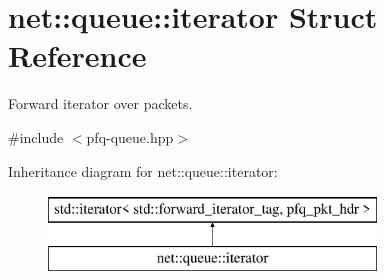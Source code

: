 \hypertarget{structnet_1_1queue_1_1iterator}{\section{net\+:\+:queue\+:\+:iterator Struct Reference}
\label{structnet_1_1queue_1_1iterator}
}


Forward iterator over packets.  




{\ttfamily \#include $<$pfq-\/queue.\+hpp$>$}

Inheritance diagram for net\+:\+:queue\+:\+:iterator\+:\begin{figure}[H]
\begin{center}
\leavevmode
\includegraphics[height=2.000000cm]{structnet_1_1queue_1_1iterator}
\end{center}
\end{figure}
